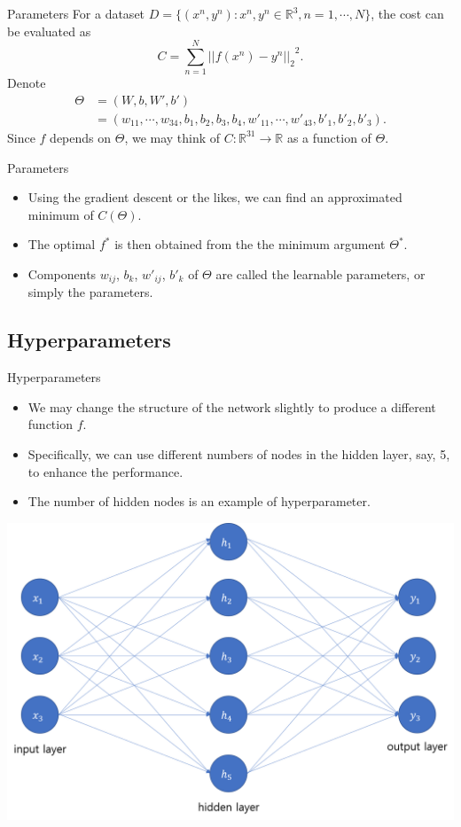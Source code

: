 \documentclass{beamer}
\begin{document}
%
\begin{frame}{Parameters}
For a dataset \(D=\{(x^n,y^n):x^n,y^n\in\mathbb R^3,n=1,\cdots,N\}\), the cost can be evaluated as
\begin{equation}\label{cost}
C=\sum_{n=1}^N{||f(x^n)-y^n||_2}^2.
\end{equation}
Denote
\begin{align*}
\Theta
&=(W,b,W',b')\\
&=(w_{11},\cdots,w_{34},b_1,b_2,b_3,b_4,w'_{11},\cdots,w'_{43},b'_1,b'_2,b'_3).
\end{align*}
Since \(f\) depends on \(\Theta\), we may think of \(C:\mathbb R^{31}\to\mathbb R\) as a function of \(\Theta\).
\end{frame}

%
\begin{frame}{Parameters}
\begin{itemize}
\item
Using the gradient descent or the likes, we can find an approximated minimum of \(C(\Theta)\).
\item
The optimal \(f^*\) is then obtained from the the minimum argument \(\Theta^*\).
\item
Components \(w_{ij}\), \(b_k\), \(w'_{ij}\), \(b'_k\) of \(\Theta\) are called the learnable parameters, or simply the \alert{parameters}.
\end{itemize}
\end{frame}

\subsection{Hyperparameters}

%
\begin{frame}{Hyperparameters}
\begin{itemize}
\item
We may change the structure of the network slightly to produce a different function \(f\).
\item
Specifically, we can use different \alert{numbers of nodes in the hidden layer}, say, 5, to enhance the performance.
\item
The number of hidden nodes is an example of \alert{hyperparameter}.
\end{itemize}
\begin{center}
\includegraphics[width=.5\textwidth]{1_2_mlp}
\end{center}
\end{frame}
\end{document}
